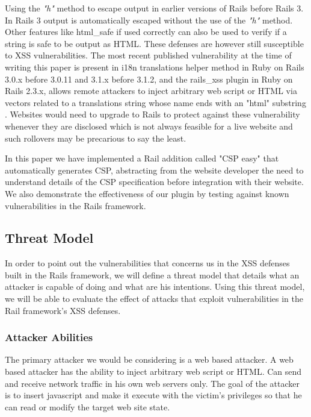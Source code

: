 \documentclass[10pt, conference, compsocconf]{IEEEtran}
\begin{document}
Using the \emph{"h"} method to escape output in earlier versions of Rails before Rails 3. In Rails 3 output is automatically escaped without the use of the \emph{"h"} method. 
Other features like html\_safe if used correctly can also be used to verify if a string is safe to be output as HTML. These defenses are however still susceptible to XSS vulnerabilities. The most recent published vulnerability at the time of writing this paper is present in i18n translations helper method in Ruby on Rails 3.0.x before 3.0.11 and 3.1.x before 3.1.2, and the rails\_xss plugin in Ruby on Rails 2.3.x, allows remote attackers to inject arbitrary web script or HTML via vectors related to a translations string whose name ends with an "html" substring \cite{IEEEhowto:cve_rails}. Websites would need to upgrade to Rails to protect against these vulnerability whenever they are disclosed which is not always feasible for a live website and such rollovers may be precarious to say the least.

In this paper we have implemented a Rail addition called "CSP easy" that automatically generates CSP, abstracting from the website developer the need to understand details of the CSP specification before integration with their website. We also demonstrate the effectiveness of our plugin by testing against known vulnerabilities in the Rails framework.

\subsection{Threat Model}
In order to point out the vulnerabilities that concerns us in the XSS defenses built in the Rails framework, we will define a threat model that details what an attacker is capable of doing and what are his intentions. Using this threat model, we will be able to evaluate the effect of attacks that exploit vulnerabilities in the Rail framework's XSS defenses. 

\subsubsection{Attacker Abilities}
The primary attacker we would be considering is a web based attacker. A web based attacker has the ability to inject arbitrary web script or HTML. Can send and receive network traffic in his own web servers only. The goal of the attacker is to insert javascript and make it execute with the victim’s privileges so that he can read or modify the target web site state.
\end{document}
